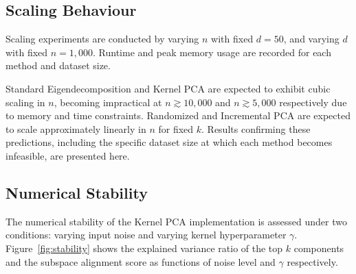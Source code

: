 \begin{figure}[tbp]
    \begin{center}
    \end{center}
\end{figure}

\subsection{Scaling Behaviour}

Scaling experiments are conducted by varying $n$ with fixed $d = 50$, and varying $d$ with fixed $n = 1{,}000$. Runtime and peak memory usage are
recorded for each method and dataset size.

\begin{figure}[tbp]
    \begin{center}
    \end{center}
\end{figure}

Standard Eigendecomposition and Kernel PCA are expected to exhibit cubic
scaling in $n$, becoming impractical at $n \gtrsim 10{,}000$ and
$n \gtrsim 5{,}000$ respectively due to memory and time constraints. Randomized
and Incremental PCA are expected to scale approximately linearly in $n$ for
fixed $k$. Results confirming these predictions, including the specific dataset
size at which each method becomes infeasible, are presented here.

\subsection{Numerical Stability}

The numerical stability of the Kernel PCA implementation is assessed under
two conditions: varying input noise and varying kernel hyperparameter $\gamma$.
Figure~\ref{fig:stability} shows the explained variance ratio of the top $k$
components and the subspace alignment score as functions of noise level and
$\gamma$ respectively.

\begin{figure}[tbp]
    \begin{center}
    \end{center}
\end{figure}

